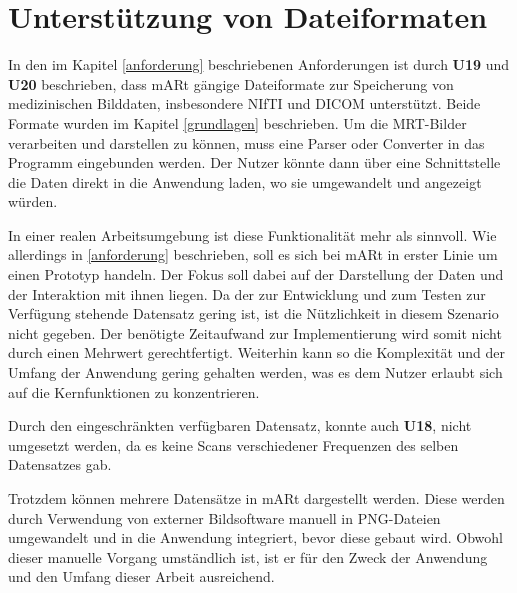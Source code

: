 

\section{Unterstützung von Dateiformaten} 

In den im Kapitel \ref{anforderung} beschriebenen Anforderungen ist durch \textbf{U19} und \textbf{U20} beschrieben, dass mARt gängige Dateiformate zur Speicherung von medizinischen Bilddaten, insbesondere NIfTI und DICOM unterstützt. Beide Formate wurden im Kapitel \ref{grundlagen} beschrieben. 
Um die MRT-Bilder verarbeiten und darstellen zu können, muss eine Parser oder Converter in das Programm eingebunden werden. 
Der Nutzer könnte dann über eine Schnittstelle die Daten direkt in die Anwendung laden, wo sie umgewandelt und angezeigt würden. 

In einer realen Arbeitsumgebung ist diese Funktionalität mehr als sinnvoll. Wie allerdings in \ref{anforderung} beschrieben, soll es sich bei mARt in erster Linie um einen Prototyp handeln.
Der Fokus soll dabei auf der Darstellung der Daten und der Interaktion mit ihnen liegen. Da der zur Entwicklung und zum Testen zur Verfügung stehende Datensatz gering ist, ist die Nützlichkeit in diesem Szenario nicht gegeben. Der benötigte Zeitaufwand zur Implementierung wird somit nicht durch einen Mehrwert gerechtfertigt.
Weiterhin kann so die Komplexität und der Umfang der Anwendung gering gehalten werden, was es dem Nutzer erlaubt sich auf die Kernfunktionen zu konzentrieren. 

Durch den eingeschränkten verfügbaren Datensatz, konnte auch \textbf{U18}, nicht umgesetzt werden, da es keine Scans verschiedener Frequenzen des selben Datensatzes gab.

Trotzdem können mehrere Datensätze in mARt dargestellt werden. Diese werden durch Verwendung von externer Bildsoftware manuell in PNG-Dateien umgewandelt und in die Anwendung integriert, bevor diese gebaut wird. 
Obwohl dieser manuelle Vorgang umständlich ist, ist er für den Zweck der Anwendung und den Umfang dieser Arbeit ausreichend.
